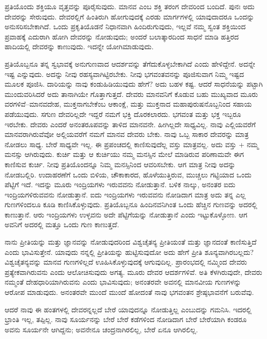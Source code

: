 ಪ್ರತಿಯೊಂದು ಶಕ್ತಿಯೂ ವೃತ್ತವನ್ನು ಪೂರೈಸುವುದು. ಮಾನವ ಎಂಬ ಶಕ್ತಿ ತರಂಗ ದೇವರಿಂದ ಬಂದಿದೆ. ಪುನಃ ಅದು ದೇವರನ್ನು ಸೇರುವುದು. ದೇವರಲ್ಲಿಗೆ ಹಿಂತಿರುಗಿ ಹೋಗುವುದಕ್ಕೆ ಎರಡು ಮಾರ್ಗಗಳಲ್ಲಿ ಯಾವುದಾದರೂ ಒಂದನ್ನು ಅನುಸರಿಸಬೇಕಾಗಿದೆ. ಒಂದು ಪ್ರಕೃತಿಯೊಡನೆ ನಿಧಾನವಾಗಿ ಹಿಂದಿರುಗುವುದು, ಇಲ್ಲವೆ ನಮ್ಮ ಸ್ವಂತ ಶಕ್ತಿಯಿಂದ ಪ್ರವಾಹಕ್ಕೆ ಎದುರಾಗಿ ಹೋಗಿ ದೇವರನ್ನು ನೋಡುವುದು; ಅಂದರೆ ಬಲಾತ್ಕಾರದಿಂದ ಸಾಧನೆ ಮಾಡಿ ಹತ್ತಿರದ ಹಾದಿಯಲ್ಲಿ ದೇವರನ್ನು ಕಾಣುವುದು. ಇದನ್ನೇ ಯೋಗಿ\break ಮಾಡುವುದು.

ಪ್ರತಿಯೊಬ್ಬನೂ ತನ್ನ ಸ್ವಭಾವಕ್ಕೆ ಅನುಗುಣವಾದ ಆದರ್ಶವನ್ನು ತೆಗೆದುಕೊಳ್ಳಬೇಕಾಗಿದೆ ಎಂದು ಹೇಳಿದ್ದೇನೆ. ಅದನ್ನೇ ಇಷ್ಟ ಎನ್ನುವುದು. ಅದನ್ನು ನೀವು ರಹಸ್ಯವಾಗಿಟ್ಟಿರಬೇಕು. ನೀವು ಭಗವಂತವನನ್ನು ಪೂಜಿಸುವಾಗ ನಿಮ್ಮ ಇಷ್ಟದ ಮೂಲಕ ಪೂಜಿಸಿ. ದಾರಿಯನ್ನು ನಾವು ಕಂಡುಹಿಡಿಯುವುದು ಹೇಗೆ? ಅದು ಬಹಳ ಕಷ್ಟ. ಆದರೆ ಸಾಧನೆಯನ್ನು ಪಟ್ಟಾಗಿ ಮುಂದುವರಿಸಿದರೆ ಅದು ತಾನಾಗಿಯೇ ಗೊತ್ತಾಗುತ್ತದೆ. ದೇವರು ಮಾನವನಿಗೆ ಕೊಡುವ ಬಹು ಮುಖ್ಯವಾದ ಮೂರು ವರಗಳಿವೆ–ಮಾನವದೇಹ, ಮುಕ್ತನಾಗಬೇಕೆಂಬ ಆಕಾಂಕ್ಷೆ, ಮತ್ತು ಮುಕ್ತನಾದ ಮಹಾಪುರುಷನೊಬ್ಬನಿಂದ ಸಹಾಯ ಪಡೆಯುವುದು. ಸಗುಣ ದೇವರಿಲ್ಲದೇ ಇದ್ದರೆ ನಮಗೆ ಭಕ್ತಿ ದೊರಕಲಾರದು. ಭಗವಂತ ಮತ್ತು ಭಕ್ತ ಇಬ್ಬರೂ ಇರಬೇಕು. ದೇವರು ಎಂದರೆ ಅನಂತರೂಪವನ್ನು ತಾಳಿದ ಮಾನವನೇ. ಹೀಗಿಲ್ಲದೇ ಸಾಧ್ಯವಿಲ್ಲ. ನಾವು ಎಲ್ಲಿಯವರೆಗೆ ಮಾನವರಾಗಿರುವೆವೋ ಅಲ್ಲಿಯವರೆಗೆ ನಮಗೆ ಮಾನವ ದೇವರು ಬೇಕು. ನಾವು ಒಬ್ಬ ಸಾಕಾರ ದೇವರನ್ನು ಮಾತ್ರ ನೋಡಲು ಸಾಧ್ಯ. ಬೇರೆ ಸಾಧ್ಯವೇ ಇಲ್ಲ. ಈ ಪ್ರಪಂಚದಲ್ಲಿ ಕಾಣಿಸುವುದೆಲ್ಲ ವಸ್ತು ಮಾತ್ರವಲ್ಲ. ಅದು ವಸ್ತು + ನಮ್ಮ ಮನಸ್ಸು ಆಗಿರುವುದು. ಕುರ್ಚಿ ಮತ್ತು ಆ ಕುರ್ಚಿಯು ನಮ್ಮ ಮನಸ್ಸಿನ ಮೇಲೆ ಮಾಡಿರುವ ಪರಿಣಾಮವೇ ಈಗ ಕಾಣಿಸುವ ಕುರ್ಚಿ. ನೀವು ಪ್ರತಿಯೊಂದನ್ನೂ ನಿಮ್ಮ ಮನಸ್ಸಿನಿಂದ ಆವರಿಸಬೇಕು. ಆಗ ಮಾತ್ರ ನೀವು ಅದನ್ನು ನೋಡಬಲ್ಲಿರಿ. ಉದಾಹರಣೆಗೆ ಒಂದು ಬಿಳಿಯ, ಚೌಕಾಕಾರದ, ಹೊಳೆಯುತ್ತಿರುವ, ಮುಚ್ಚಲು ಗಟ್ಟಿಯಾದ ಒಂದು ಪೆಟ್ಟಿಗೆ ಇದೆ. ಇದನ್ನು ಮೂರು ಇಂದ್ರಿಯಗಳು ಇರುವವನು ನೋಡುತ್ತಾನೆ. ಬಳಿಕ ನಾಲ್ಕು, ಅನಂತರ ಐದು ಇಂದ್ರಿಯಗಳಿರುವವನು ನೋಡುತ್ತಾನೆ. ಐದು ಇಂದ್ರಿಯಗಳು ಇರುವವನು ನೋಡಿದಾಗ ಮಾತ್ರ ಅದು ತನ್ನ ಎಲ್ಲ ಗುಣಗಳಿಂದಲೂ ಕೂಡಿ ಕಾಣಿಸಿಕೊಳ್ಳುವುದು. ಪ್ರತಿಯೊಬ್ಬನೂ ಹಿಂದಿನವನಿಗಿಂತ ಒಂದು ಹೆಚ್ಚಿನ ಗುಣವನ್ನು ಅದರಲ್ಲಿ ಕಾಣುತ್ತಾನೆ. ಆರು ಇಂದ್ರಿಯಗಳು ಉಳ್ಳವನು ಅದೇ ಪೆಟ್ಟಿಗೆಯನ್ನು ನೋಡುತ್ತಾನೆ ಎಂದು ಇಟ್ಟುಕೊಳ್ಳೋಣ. ಆಗ ಅವನಿಗೆ ಅದರಲ್ಲಿ ಮತ್ತೂ ಒಂದು ಗುಣ ಕಾಣುತ್ತದೆ.

ನಾನು ಪ್ರೀತಿಯನ್ನು ಮತ್ತು ಜ್ಞಾನವನ್ನು ನೋಡುವುದರಿಂದ ವಿಶ್ವಚೈತನ್ಯ ಪ್ರೀತಿಯಂತೆ ಮತ್ತು ಜ್ಞಾನದಂತೆ ಕಾಣಿಸುತ್ತಿದೆ ಎಂದು ಭಾವಿಸುತ್ತೇನೆ. ಯಾವುದು ನನ್ನಲ್ಲಿ ಪ್ರೀತಿಯನ್ನು ಹುಟ್ಟಿಸುವುದೋ ಅದು ಹೇಗೆ ಪ್ರೀತಿ ಶೂನ್ಯವಾಗಿರಬಲ್ಲದು? ವಿಶ್ವಚೈತನ್ಯವನ್ನು ಮಾನವ ಗುಣಗಳಿಲ್ಲದೆ ಊಹಿಸಿಕೊಳ್ಳುವುದಕ್ಕೆ ಆಗುವುದಿಲ್ಲ. ಪ್ರಾರಂಭದಲ್ಲಿ ನಮ್ಮಿಂದ ದೇವರು ಪ್ರತ್ಯೇಕವಾಗಿರುವನು ಎಂದು ಆಲೋಚಿಸುವುದು ಅಗತ್ಯ. ಮೂರು ದೇವರ ಆದರ್ಶಗಳಿವೆ. ಅತಿ ಕೆಳಗಿರುವುದೇ, ದೇವರು ನಮ್ಮಂತೆ ದೇಹಧಾರಿಯಾಗಿರುವನು ಎಂದು ಭಾವಿಸುವುದು; ಅನಂತರವೇ ಅವನಲ್ಲಿ ಮಾನವೀಯ ಗುಣಗಳನ್ನು ಆರೋಪ ಮಾಡುವುದು. ಅನಂತರವೇ ಮುಂದೆ ಮುಂದೆ ಹೋದಂತೆ ನಾವು ಭಗವಂತನ ಶ್ರೇಷ್ಠಭಾವನೆಗೆ ಬರುವೆವು.

ಆದರೆ ನಾವು ಈ ಹಂತಗಳಲ್ಲಿ ದೇವರನ್ನಲ್ಲದೆ ಬೇರೆ ಯಾವುದನ್ನೂ ನೋಡುತ್ತಿಲ್ಲ ಎಂಬುದನ್ನು ಗಮನಿಸಿ. ಇದರಲ್ಲಿ ಭ್ರಾಂತಿ ಇಲ್ಲ, ತಪ್ಪಿಲ್ಲ. ನಾವು ಸೂರ್ಯನನ್ನು ಬೇರೆ ಬೇರೆ ಕಡೆಗಳಿಂದ ನೋಡಿದಾಗ ಬೇರೆ ಬೇರೆಯಾಗಿ ಕಂಡರೂ ಅವನು ಸೂರ್ಯನೇ ಆಗಿದ್ದನು; ಅವನೇನೂ ಚಂದ್ರನಾಗಿರಲಿಲ್ಲ, ಬೇರೆ ಏನೂ ಆಗಿರಲಿಲ್ಲ.

